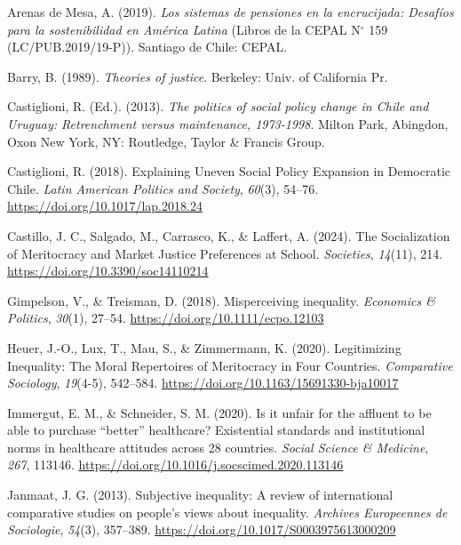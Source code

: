 \documentclass[
  12pt,
  letterpaper,
  DIV=11,
  numbers=noendperiod]{scrartcl}
\newlength{\cslhangindent}
\newenvironment{CSLReferences}[2] %
 {\begin{list}{}{%
  \setlength{\itemindent}{0pt}
  \setlength{\leftmargin}{0pt}
  \setlength{\parsep}{0pt}
  \ifodd #1
   \setlength{\leftmargin}{\cslhangindent}
   \setlength{\itemindent}{-1\cslhangindent}
  \fi
  \setlength{\itemsep}{#2\baselineskip}}}
 {\end{list}}
\begin{document}
\label{refs}
\begin{CSLReferences}{1}{0}
Arenas de Mesa, A. (2019). \emph{Los sistemas de pensiones en la
encrucijada: Desaf{í}os para la sostenibilidad en {Am{é}rica Latina}}
(Libros de la CEPAL N{\(^\circ\)} 159 (LC/PUB.2019/19-P)). Santiago de
Chile: CEPAL.

Barry, B. (1989). \emph{Theories of justice}. Berkeley: Univ. of
California Pr.

Castiglioni, R. (Ed.). (2013). \emph{The politics of social policy
change in {Chile} and {Uruguay}: Retrenchment versus maintenance,
1973-1998}. Milton Park, Abingdon, Oxon New York, NY: Routledge, Taylor
\& Francis Group.

Castiglioni, R. (2018). Explaining {Uneven Social Policy Expansion} in
{Democratic Chile}. \emph{Latin American Politics and Society},
\emph{60}(3), 54--76. \url{https://doi.org/10.1017/lap.2018.24}

Castillo, J. C., Salgado, M., Carrasco, K., \& Laffert, A. (2024). The
{Socialization} of {Meritocracy} and {Market Justice Preferences} at
{School}. \emph{Societies}, \emph{14}(11), 214.
\url{https://doi.org/10.3390/soc14110214}

Gimpelson, V., \& Treisman, D. (2018). Misperceiving inequality.
\emph{Economics \& Politics}, \emph{30}(1), 27--54.
\url{https://doi.org/10.1111/ecpo.12103}

Heuer, J.-O., Lux, T., Mau, S., \& Zimmermann, K. (2020). Legitimizing
{Inequality}: {The Moral Repertoires} of {Meritocracy} in {Four
Countries}. \emph{Comparative Sociology}, \emph{19}(4-5), 542--584.
\url{https://doi.org/10.1163/15691330-bja10017}

Immergut, E. M., \& Schneider, S. M. (2020). Is it unfair for the
affluent to be able to purchase {``better''} healthcare? {Existential}
standards and institutional norms in healthcare attitudes across 28
countries. \emph{Social Science \& Medicine}, \emph{267}, 113146.
\url{https://doi.org/10.1016/j.socscimed.2020.113146}

Janmaat, J. G. (2013). Subjective inequality: {A} review of
international comparative studies on people's views about inequality.
\emph{Archives Europeennes de Sociologie}, \emph{54}(3), 357--389.
\url{https://doi.org/10.1017/S0003975613000209}


\end{CSLReferences}
\end{document}
